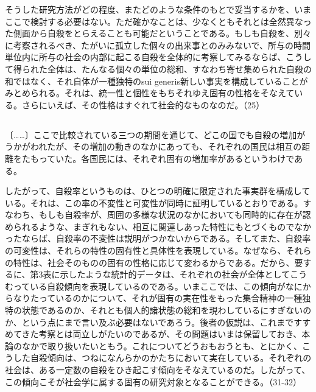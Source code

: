 そうした研究方法がどの程度、またどのような条件のもとで妥当するかを、いまここで検討する必要はない。ただ確かなことは、少なくともそれとは全然異なった側面から自殺をとらえることも可能だということである。もしも自殺を、別々に考察されるべき、たがいに孤立した個々の出来事とのみみないで、所与の時間単位内に所与の社会の内部に起こる自殺を全体的に考察してみるならば、こうして得られた全体は、たんなる個々の単位の総和、すなわち寄せ集められた自殺の和ではなく、それ自体が一種独特のsui generis新しい事実を構成していることがみとめられる。それは、統一性と個性をもちそれゆえ固有の性格をそなえている。さらにいえば、その性格はすぐれて社会的なものなのだ。（25）

\subsection{}


〔……〕ここで比較されている三つの期間を通じて、どこの国でも自殺の増加がうかがわれたが、その増加の動きのなかにあっても、それぞれの国民は相互の距離をたもっていた。各国民には、それぞれ固有の増加率があるというわけである。

したがって、自殺率というものは、ひとつの明確に限定された事実群を構成している。それは、この率の不変性と可変性が同時に証明しているとおりである。すなわち、もしも自殺率が、周囲の多様な状況のなかにおいても同時的に存在が認められるような、まぎれもない、相互に関連しあった特性にもとづくものでなかったならば、自殺率の不変性は説明がつかないからである。そしてまた、自殺率の可変性は、それらの特性の固有性と具体性を表現している。なぜなら、それらの特性は、社会そのものの固有の性格に応じて変わるからである。だから、要するに、第3表に示したような統計的データは、それぞれの社会が全体としてこうむっている自殺傾向を表現しているのである。いまここでは、この傾向がなにからなりたっているのかについて、それが固有の実在性をもった集合精神の一種独特の状態であるのか、それとも個人的諸状態の総和を現わしているにすぎないのか、という点にまで言い及ぶ必要はないであろう。後者の仮説は、これまですすめてきた考察とは両立しがたいのであるが、その問題はいまは保留しておき、本論のなかで取り扱いたいともう。これについてどうおもおうとも、とにかく、こうした自殺傾向は、つねになんらかのかたちにおいて実在している。それぞれの社会は、ある一定数の自殺をひき起こす傾向をそなえているのだ。したがって、この傾向こそが社会学に属する固有の研究対象となることができる。（31-32）

\subsection{}



